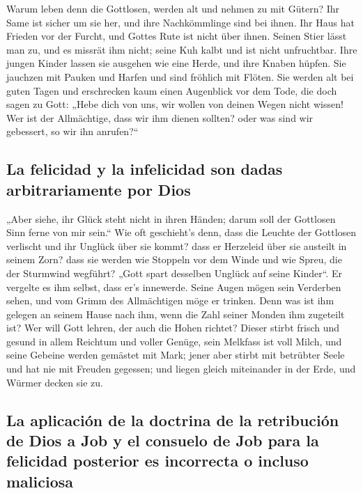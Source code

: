  Warum leben denn die Gottlosen, werden alt und nehmen zu
mit Gütern?  Ihr Same ist sicher um sie her, und ihre
Nachkömmlinge sind bei ihnen.  Ihr Haus hat Frieden vor
der Furcht, und Gottes Rute ist nicht über ihnen.  Seinen
Stier lässt man zu, und es missrät ihm nicht; seine Kuh kalbt und ist
nicht unfruchtbar.  Ihre jungen Kinder lassen sie
ausgehen wie eine Herde, und ihre Knaben hüpfen.  Sie
jauchzen mit Pauken und Harfen und sind fröhlich mit Flöten.
 Sie werden alt bei guten Tagen und erschrecken kaum
einen Augenblick vor dem Tode,  die doch sagen zu Gott:
„Hebe dich von uns, wir wollen von deinen Wegen nicht wissen!
 Wer ist der Allmächtige, dass wir ihm dienen sollten?
oder was sind wir gebessert, so wir ihn anrufen?{}``

\hypertarget{la-felicidad-y-la-infelicidad-son-dadas-arbitrariamente-por-dios}{%
\subsection{La felicidad y la infelicidad son dadas arbitrariamente por
Dios}\label{la-felicidad-y-la-infelicidad-son-dadas-arbitrariamente-por-dios}}

 „Aber siehe, ihr Glück steht nicht in ihren Händen;
darum soll der Gottlosen Sinn ferne von mir sein.``  Wie
oft geschieht's denn, dass die Leuchte der Gottlosen verlischt und ihr
Unglück über sie kommt? dass er Herzeleid über sie austeilt in seinem
Zorn?  dass sie werden wie Stoppeln vor dem Winde und wie
Spreu, die der Sturmwind wegführt?  „Gott spart desselben
Unglück auf seine Kinder``. Er vergelte es ihm selbst, dass er's
innewerde.  Seine Augen mögen sein Verderben sehen, und
vom Grimm des Allmächtigen möge er trinken.  Denn was ist
ihm gelegen an seinem Hause nach ihm, wenn die Zahl seiner Monden ihm
zugeteilt ist?  Wer will Gott lehren, der auch die Hohen
richtet?  Dieser stirbt frisch und gesund in allem
Reichtum und voller Genüge,  sein Melkfass ist voll
Milch, und seine Gebeine werden gemästet mit Mark;  jener
aber stirbt mit betrübter Seele und hat nie mit Freuden gegessen;
 und liegen gleich miteinander in der Erde, und Würmer
decken sie zu.

\hypertarget{la-aplicaciuxf3n-de-la-doctrina-de-la-retribuciuxf3n-de-dios-a-job-y-el-consuelo-de-job-para-la-felicidad-posterior-es-incorrecta-o-incluso-maliciosa}{%
\subsection{La aplicación de la doctrina de la retribución de Dios a Job
y el consuelo de Job para la felicidad posterior es incorrecta o incluso
maliciosa}\label{la-aplicaciuxf3n-de-la-doctrina-de-la-retribuciuxf3n-de-dios-a-job-y-el-consuelo-de-job-para-la-felicidad-posterior-es-incorrecta-o-incluso-maliciosa}}

